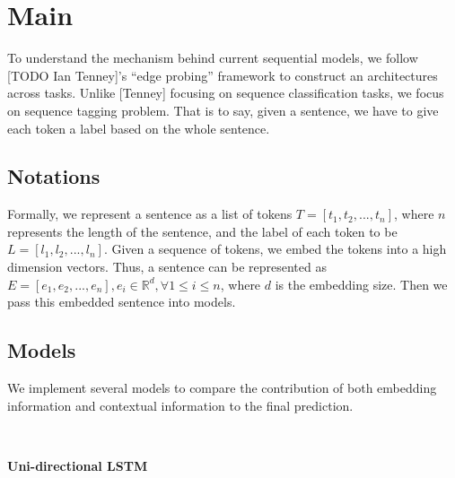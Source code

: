 \documentclass{article}
\newcommand{\red}[1]{\textcolor{red}{#1}}
\begin{document}

\section{Main}

To understand the mechanism behind current sequential models, we follow [TODO Ian Tenney]'s ``edge probing'' framework to construct an architectures across tasks. Unlike [Tenney] focusing on sequence classification tasks, we focus on sequence tagging problem. That is to say, given a sentence, we have to give each token a label based on the whole sentence.

\subsection{Notations}
Formally, we represent a sentence as a list of tokens $T = [t_1, t_2, ... , t_n]$, where $n$ represents the length of the sentence, and the label of each token to be $L = [l_1, l_2, ... , l_n]$. Given a sequence of tokens, we embed the tokens into a high dimension vectors. Thus, a sentence can be represented as $E = [e_1, e_2, ... , e_n], e_i \in \mathbb{R}^d, \forall 1 \leq i \leq n$, where $d$ is the embedding size. Then we pass this embedded sentence into models.


\subsection{Models}

We implement several models to compare the contribution of both embedding information and contextual information to the final prediction. 

\ 

\textbf{Uni-directional LSTM}
\end{document}
